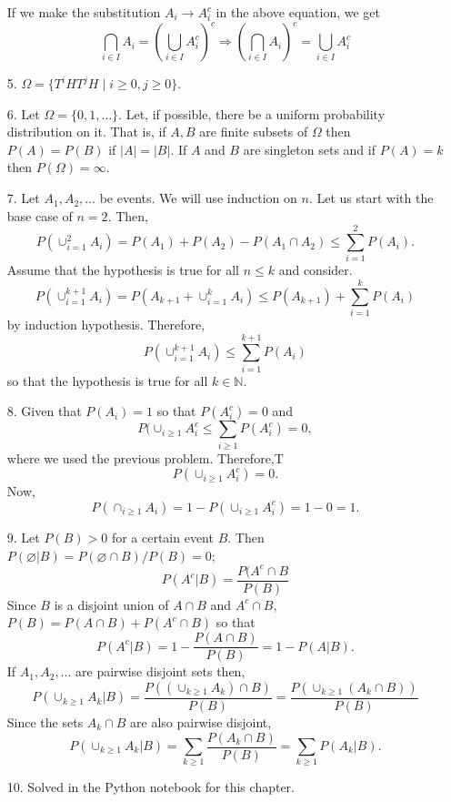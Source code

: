 \documentclass{article}
\newcommand{\son}{\mathbb{N}}
\begin{document}
\begin{enumerate}
If we make the substitution $A_i \rightarrow A_i^c$ in the above equation, we 
get
\[
\bigcap_{i\in I}A_i = \left(\bigcup_{i \in I}A_i^c\right)^c \Rightarrow
\left(\bigcap_{i \in I}A_i\right)^c = \bigcup_{i \in I}A_i^c
\]

\item[5.] $\Omega = \{T^i H T^j H\;|\; i \ge 0, j \ge 0\}$.

\item[6.] Let $\Omega = \{0, 1, \ldots\}$. Let, if possible, there be a 
uniform probability distribution on it. That is, if $A, B$ are finite subsets of
$\Omega$ then $P(A) = P(B)$ if $|A| = |B|$. If $A$ and $B$ are singleton sets 
and if $P(A) = k$ then $P(\Omega) = \infty$. 

\item[7.] Let $A_1, A_2, \ldots$ be events. We will use induction on $n$.
Let us start with the base case of $n = 2$. Then,
\[
P(\cup_{i=1}^2 A_i) = P(A_1) + P(A_2) - P(A_1 \cap A_2) \le \sum_{i=1}^2 P(A_i).
\]
Assume that the hypothesis is true for all $n \le k$ and consider.
\[
P(\cup_{i=1}^{k+1} A_i) = P(A_{k+1} + \cup_{i=1}^k A_i) \le P(A_{k+1}) + 
\sum_{i=1}^k P(A_i)
\]
by induction hypothesis. Therefore,
\[
P(\cup_{i=1}^{k+1} A_i) \le \sum_{i=1}^{k+1} P(A_i)
\]
so that the hypothesis is true for all $k \in \son$.

\item[8.] Given that $P(A_i) = 1$ so that $P(A_i^c) = 0$ and
\[
P(\cup_{i \ge 1} A_i^c \le \sum_{i \ge 1} P(A_i^c) = 0,
\]
where we used the previous problem. Therefore,T
\[
P(\cup_{i \ge 1} A_i^c) = 0.
\]
Now,
\[
P(\cap_{i \ge 1}A_i) = 1 - P(\cup_{i \ge 1}A_i^c) = 1 - 0 = 1.
\]

\item[9.] Let $P(B) > 0$ for a certain event $B$. Then $P(\varnothing|B)
= P(\varnothing \cap B)/P(B) = 0$; 
\[
P(A^c|B) = \frac{P(A^c \cap B}{P(B)}
\]
Since $B$ is a disjoint union of $A \cap B$ and $A^c \cap B$, $P(B) = P(A \cap B)
+ P(A^c \cap B)$ so that
\[
P(A^c|B) = 1 - \frac{P(A \cap B)}{P(B)} = 1 - P(A|B).
\]
If $A_1, A_2, \ldots$ are pairwise disjoint sets then,
\[
P(\cup_{k \ge 1}A_k | B) = \frac{P((\cup_{k\ge 1} A_k) \cap B)}{P(B)}
= \frac{P(\cup_{k\ge 1} (A_k \cap B))}{P(B)}
\]
Since the sets $A_k \cap B$ are also pairwise disjoint,
\[
P(\cup_{k \ge 1}A_k | B) = \sum_{k \ge 1}\frac{P(A_k \cap B)}{P(B)} = 
\sum_{k \ge 1}P(A_k | B).
\]

\item[10.] Solved in the Python notebook for this chapter.


\end{enumerate}
\end{document}
